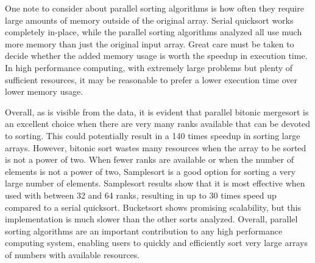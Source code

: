 \documentclass[10pt,letterpaper]{article}
\begin{document}
\begin{multicols}{2}
One note to consider about parallel sorting algorithms is how often they require large amounts of memory outside of the original array. Serial quicksort works completely in-place, while the parallel sorting algorithms analyzed all use much more memory than just the original input array. Great care must be taken to decide whether the added memory usage is worth the speedup in execution time. In high performance computing, with extremely large problems but plenty of sufficient resources, it may be reasonable to prefer a lower execution time over lower memory usage.

Overall, as is visible from the data, it is evident that parallel bitonic mergesort is an excellent choice when there are very many ranks available that can be devoted to sorting. This could potentially result in a 140 times speedup in sorting large arrays. However, bitonic sort wastes many resources when the array to be sorted is not a power of two. When fewer ranks are available or when the number of elements is not a power of two, Samplesort is a good option for sorting a very large number of elements. Samplesort results show that it is most effective when used with between 32 and 64 ranks, resulting in up to 30 times speed up compared to a serial quicksort. Bucketsort shows promising scalability, but this implementation is much slower than the other sorts analyzed. Overall, parallel sorting algorithms are an important contribution to any high performance computing system, enabling users to quickly and efficiently sort very large arrays of numbers with available resources.



\end{multicols}
\end{document}
